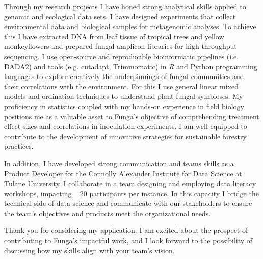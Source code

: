 \documentclass[11pt, letterpaper]{awesome-cv}
\begin{document}
\begin{cvletter}
\indent Through my research projects I have honed strong analytical skills applied to genomic and ecological data sets. I have designed experiments that collect environmental data and biological samples for metagenomic analyses. To achieve this I have extracted DNA from leaf tissue of tropical trees and yellow monkeyflowers and prepared fungal amplicon libraries for high throughput sequencing. I use open-source and reproducible bioinformatic pipelines (i.e. DADA2) and tools (e.g. cutadapt, Trimmomatic) in \emph{R} and Python programming languages to explore creatively the underpinnings of fungal communities and their correlations with the environment. For this I use general linear mixed models and ordination techniques to understand plant-fungal symbioses.  My proficiency in statistics coupled with my hands-on experience in field biology positions me as a valuable asset to Funga's objective of comprehending treatment effect sizes and correlations in inoculation experiments. I am well-equipped to contribute to the development of innovative strategies for sustainable forestry practices.

\indent In addition, I have developed strong communication and teams skills as a Product Developer for the Connolly Alexander Institute for Data Science at Tulane University. I collaborate in a team designing and employing data literacy workshops, impacting ~ 20 participants per instance. In this capacity I bridge the technical side of data science and communicate with our stakeholders to ensure the team's objectives and products meet the organizational needs. 

\indent Thank you for considering my application. I am excited about the prospect of contributing to Funga's impactful work, and I look forward to the possibility of discussing how my skills align with your team's vision.

\end{cvletter}


\makeletterclosing
\end{document}
